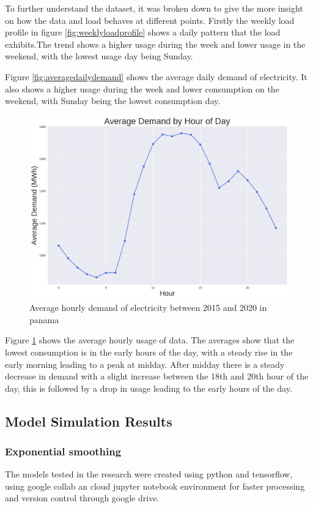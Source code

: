   
  To further understand the dataset, it was broken down to give the more insight on how the data and load behaves at different points. Firstly the weekly load profile in figure \ref{fig:weeklyloadprofile} shows a daily pattern that the load exhibits.The trend shows a higher usage during the week and lower usage in the weekend, with the lowest usage day being Sunday. 
  
  
  Figure \ref{fig:averagedailydemand} shows the average daily demand  of electricity. It also shows a higher usage during the week and lower consumption on the weekend, with Sunday being the lowest consumption day. 
  \begin{figure}[h]
  	\centering
  	\includegraphics[width=0.45\linewidth]{Chapters/images/results/average_hourly_demand}
  	\caption{Average hourly demand of electricity between 2015 and 2020 in panama}
  	\label{fig:averagehourlydemand}
  \end{figure}
  
  Figure \ref{fig:averagehourlydemand} shows the average hourly usage of data. The averages show that the lowest consumption is in the early hours of the day, with a steady rise in the early morning leading to a peak at midday. After midday there is a steady decrease in demand with a slight increase between the 18th and 20th hour of the day, this is followed by a drop in usage leading to the early hours of the day.  


\subsection{Model Simulation Results}

\subsubsection{Exponential smoothing}
The models tested in the research were created using python and tensorflow, using google collab an cloud jupyter notebook environment for faster processing and version control through google drive. 

